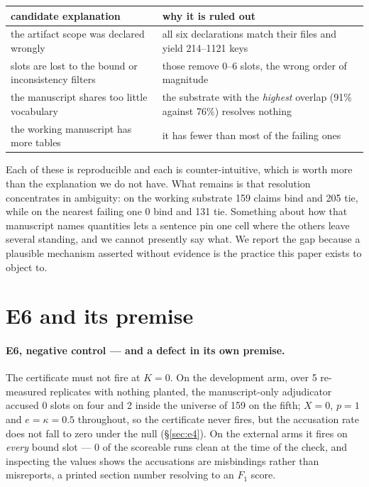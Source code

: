 \documentclass[10pt]{article}
\newcommand{\RM}[1]{{#1}}
\begin{document}
\begin{center}
\small
\begin{tabular}{@{}ll@{}}
\toprule
candidate explanation & why it is ruled out \\
\midrule
the artifact scope was declared wrongly & all six declarations match their files
and yield \RM{214--1121} keys \\
slots are lost to the bound or inconsistency filters & those remove \RM{0--6}
slots, the wrong order of magnitude \\
the manuscript shares too little vocabulary & the substrate with the
\emph{highest} overlap (\RM{91\%} against \RM{76\%}) resolves \RM{nothing} \\
the working manuscript has more tables & it has \RM{fewer} than most of the
failing ones \\
\bottomrule
\end{tabular}
\end{center}

\noindent Each of these is reproducible and each is counter-intuitive, which is
worth more than the explanation we do not have. What remains is that resolution
concentrates in ambiguity: on the working substrate \RM{159} claims bind and
\RM{205} tie, while on the nearest failing one \RM{0} bind and \RM{131} tie.
Something about how that manuscript names quantities lets a sentence pin one
cell where the others leave several standing, and we cannot presently say what.
We report the gap because a plausible mechanism asserted without evidence is the
practice this paper exists to object to.



\section{E6 and its premise}

\paragraph{E6, negative control --- and a defect in its own premise.} The
certificate must not fire at $K=0$. On the development arm, over \RM{5}
re-measured replicates with nothing planted, the manuscript-only adjudicator
accused \RM{0} slots on four and \RM{2} inside the universe of \RM{159} on the
fifth; $X=\RM{0}$, $p=\RM{1}$ and $e=\kappa=\RM{0.5}$ throughout, so the certificate never fires, but
the accusation rate does not fall to zero under the null
(\S\ref{sec:e4}). On the external arms it fires on \emph{every} bound slot ---
\RM{0} of the scoreable runs clean at the time of the check, and inspecting the
values shows the accusations are misbindings rather than misreports, a printed
section number resolving to an $F_1$ score.
\end{document}
